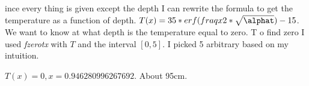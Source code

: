 \documentclass[12pt]{article}
\begin{document}
\section{}

ince every thing is given except the depth I can rewrite the formula to get the temperature as a function of depth. $T(x) = 35*erf(fraq{x}{2*\sqrt{\alphat}}) - 15$. We want to know at what depth is the temperature equal to zero. T o find zero I used \textit{fzerotx} with $T$ and the interval $[0, 5]$. I picked 5 arbitrary based on my intuition.

$T(x) = 0, x = 0.946280996267692$. About 95cm.
\end{document}
